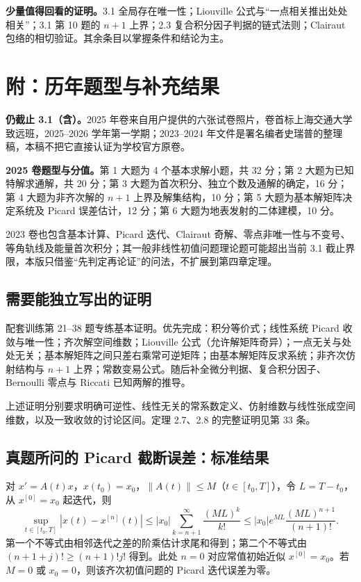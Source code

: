 \textbf{少量值得回看的证明。}3.1 全局存在唯一性；Liouville 公式与“一点相关推出处处相关”；3.1 第 10 题的 $n+1$ 上界；2.3 复合积分因子判据的链式法则；Clairaut 包络的相切验证。其余条目以掌握条件和结论为主。

\section*{附：历年题型与补充结果}
\textbf{仍截止 3.1（含）。}2025 年卷来自用户提供的六张试卷照片，卷首标上海交通大学致远班，2025--2026 学年第一学期；2023--2024 年文件是署名编者史瑞普的整理稿，本稿不把它直接认证为学校官方原卷。

\textbf{2025 卷题型与分值。}第 1 大题为 4 个基本求解小题，共 32 分；第 2 大题为已知特解求通解，共 20 分；第 3 大题为首次积分、独立个数及通解的确定，16 分；第 4 大题为非齐次解的 $n+1$ 上界及解集结构，10 分；第 5 大题为基本解矩阵决定系统及 Picard 误差估计，12 分；第 6 大题为地表发射的二体建模，10 分。

2023 卷也包含基本计算、Picard 迭代、Clairaut 奇解、零点非唯一性与不变号、等角轨线及能量首次积分；其一般非线性初值问题理论题可能超出当前 3.1 截止界限，本版只借鉴“先判定再论证”的问法，不扩展到第四章定理。

\subsection*{需要能独立写出的证明}
配套训练第 21--38 题专练基本证明。优先完成：积分等价式；线性系统 Picard 收敛与唯一性；齐次解空间维数；Liouville 公式（允许解矩阵奇异）；一点无关与处处无关；基本解矩阵之间只差右乘常可逆矩阵；由基本解矩阵反求系统；非齐次仿射结构与 $n+1$ 上界；常数变易公式。随后补全微分判据、复合积分因子、Bernoulli 零点与 Riccati 已知两解的推导。

上述证明分别要求明确可逆性、线性无关的常系数定义、仿射维数与线性张成空间维数，以及一致收敛的讨论区间。定理 2.7、2.8 的完整证明见第 33 条。

\subsection*{真题所问的 Picard 截断误差：标准结果}
对 $x'=A(t)x$，$x(t_0)=x_0$，$\|A(t)\|\le M$（$t\in[t_0,T]$），令 $L=T-t_0$，从 $x^{[0]}=x_0$ 起迭代，则
\[
\sup_{t\in[t_0,T]}|x(t)-x^{[n]}(t)|
\le |x_0|\sum_{k=n+1}^{\infty}\frac{(ML)^k}{k!}
\le |x_0|e^{ML}\frac{(ML)^{n+1}}{(n+1)!}.
\]
第一个不等式由相邻迭代之差的阶乘估计求尾和得到；第二个不等式由 $(n+1+j)!\ge(n+1)!j!$ 得到。此处 $n=0$ 对应常值初始近似 $x^{[0]}=x_0$。若 $M=0$ 或 $x_0=0$，则该齐次初值问题的 Picard 迭代误差为零。

